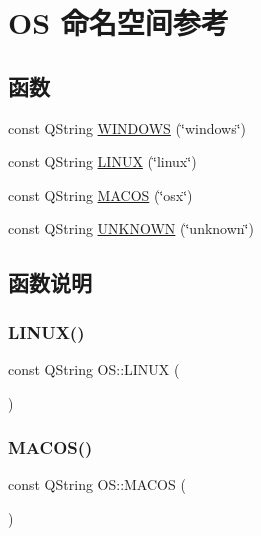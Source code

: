 \hypertarget{namespace_o_s}{}\section{OS 命名空间参考}
\label{namespace_o_s}
\subsection*{函数}
\begin{DoxyCompactItemize}
\item 
const Q\+String \mbox{\hyperlink{namespace_o_s_a2dcd39954f1ad7e384ddc37ae70e4088}{W\+I\+N\+D\+O\+WS}} (\char`\"{}windows\char`\"{})
\item 
const Q\+String \mbox{\hyperlink{namespace_o_s_a3b9e01a079577c10fe2eae3ce2bac078}{L\+I\+N\+UX}} (\char`\"{}linux\char`\"{})
\item 
const Q\+String \mbox{\hyperlink{namespace_o_s_a5980a234f47df193461e5d28f54e6845}{M\+A\+C\+OS}} (\char`\"{}osx\char`\"{})
\item 
const Q\+String \mbox{\hyperlink{namespace_o_s_a03d369686c450602db02bac63d973c99}{U\+N\+K\+N\+O\+WN}} (\char`\"{}unknown\char`\"{})
\end{DoxyCompactItemize}


\subsection{函数说明}
\mbox{\label{namespace_o_s_a3b9e01a079577c10fe2eae3ce2bac078}} 
\subsubsection{\texorpdfstring{L\+I\+N\+U\+X()}{LINUX()}}
{\footnotesize\ttfamily const Q\+String O\+S\+::\+L\+I\+N\+UX (\begin{DoxyParamCaption}\item[{\char`\"{}linux\char`\"{}}]{ }\end{DoxyParamCaption})}

\mbox{\label{namespace_o_s_a5980a234f47df193461e5d28f54e6845}} 
\subsubsection{\texorpdfstring{M\+A\+C\+O\+S()}{MACOS()}}
{\footnotesize\ttfamily const Q\+String O\+S\+::\+M\+A\+C\+OS (\begin{DoxyParamCaption}\item[{\char`\"{}osx\char`\"{}}]{ }\end{DoxyParamCaption})}


